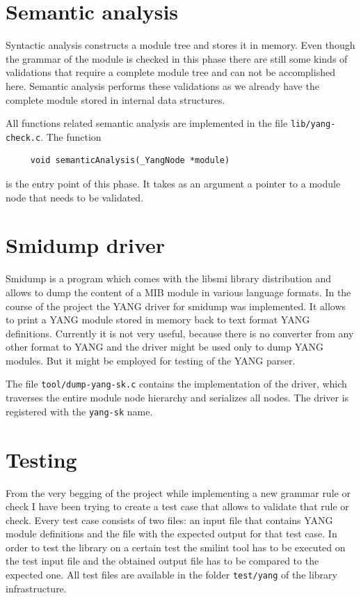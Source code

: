 \documentclass[conference]{IEEEtran}
\begin{document}
\section{Semantic analysis}
Syntactic analysis constructs a module tree and stores it in memory. 
Even though the grammar of the module is checked in this phase there are still some kinds of validations that require a complete module tree
and can not be accomplished here. Semantic analysis performs these validations as we already have the complete module stored in internal data structures.

All functions related semantic analysis are implemented in the file \texttt{lib/yang-check.c}. The function
\small
\begin{verbatim}
     void semanticAnalysis(_YangNode *module)
\end{verbatim}
\normalsize
is the entry point of this phase. It takes as an argument a pointer to a module node that needs to be validated. 

\section{Smidump driver}
Smidump is a program which comes with the libsmi library distribution and allows to dump the content of a MIB module in various language formats. In the course of the project the YANG driver for smidump was implemented. It allows to print a YANG module stored in memory back to text format YANG definitions. Currently it is not very useful, because there is no converter from any other format to YANG and the driver might be used only to dump YANG modules. But it might be employed for testing of the YANG parser.

The file \texttt{tool/dump-yang-sk.c} contains the implementation of the driver, which traverses the entire module node hierarchy and serializes all nodes. The driver is registered with the \texttt{yang-sk} name.

\section{Testing}
From the very begging of the project  while implementing a new grammar rule or check I have been trying to create a test case that allows to validate that rule or check. Every test case consists of two files: an input file that contains YANG module definitions and the file with the expected output for that test case. In order to test the library on a certain test the smilint tool has to be executed on the test input file and the obtained output file has to be compared to the expected one. All test files are available in the folder 	\texttt{test/yang} of the library infrastructure.
\end{document}
